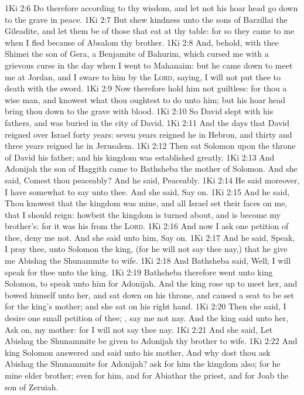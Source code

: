 \vs 1Ki 2:6 Do therefore according to thy wisdom, and let not his hoar head go down to the grave in peace.
\vs 1Ki 2:7 But shew kindness unto the sons of Barzillai the Gileadite, and let them be of those that eat at thy table: for so they came to me when I fled because of Absalom thy brother.
\vs 1Ki 2:8 And, behold,  with thee Shimei the son of Gera, a Benjamite of Bahurim, which cursed me with a grievous curse in the day when I went to Mahanaim: but he came down to meet me at Jordan, and I sware to him by the \textsc{Lord}, saying, I will not put thee to death with the sword.
\vs 1Ki 2:9 Now therefore hold him not guiltless: for thou  a wise man, and knowest what thou oughtest to do unto him; but his hoar head bring thou down to the grave with blood.
\vs 1Ki 2:10 So David slept with his fathers, and was buried in the city of David.
\vs 1Ki 2:11 And the days that David reigned over Israel  forty years: seven years reigned he in Hebron, and thirty and three years reigned he in Jerusalem.
\vs 1Ki 2:12 Then sat Solomon upon the throne of David his father; and his kingdom was established greatly.
\vs 1Ki 2:13 And Adonijah the son of Haggith came to Bathsheba the mother of Solomon. And she said, Comest thou peaceably? And he said, Peaceably.
\vs 1Ki 2:14 He said moreover, I have somewhat to say unto thee. And she said, Say on.
\vs 1Ki 2:15 And he said, Thou knowest that the kingdom was mine, and  all Israel set their faces on me, that I should reign: howbeit the kingdom is turned about, and is become my brother's: for it was his from the \textsc{Lord}.
\vs 1Ki 2:16 And now I ask one petition of thee, deny me not. And she said unto him, Say on.
\vs 1Ki 2:17 And he said, Speak, I pray thee, unto Solomon the king, (for he will not say thee nay,) that he give me Abishag the Shunammite to wife.
\vs 1Ki 2:18 And Bathsheba said, Well; I will speak for thee unto the king.
\vs 1Ki 2:19 Bathsheba therefore went unto king Solomon, to speak unto him for Adonijah. And the king rose up to meet her, and bowed himself unto her, and sat down on his throne, and caused a seat to be set for the king's mother; and she sat on his right hand.
\vs 1Ki 2:20 Then she said, I desire one small petition of thee; , say me not nay. And the king said unto her, Ask on, my mother: for I will not say thee nay.
\vs 1Ki 2:21 And she said, Let Abishag the Shunammite be given to Adonijah thy brother to wife.
\vs 1Ki 2:22 And king Solomon answered and said unto his mother, And why dost thou ask Abishag the Shunammite for Adonijah? ask for him the kingdom also; for he  mine elder brother; even for him, and for Abiathar the priest, and for Joab the son of Zeruiah.
